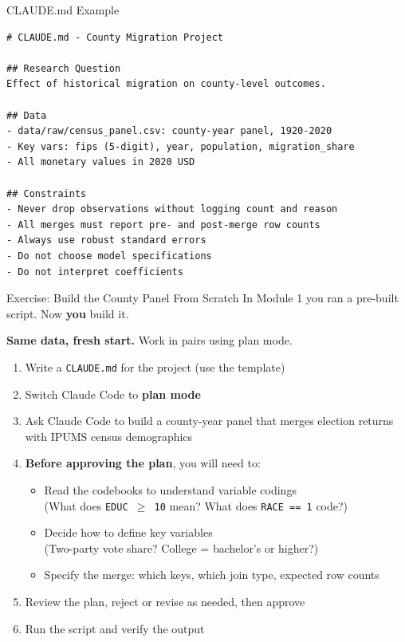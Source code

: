 \documentclass[aspectratio=169, 11pt]{beamer}
\begin{document}
\begin{frame}[fragile]{CLAUDE.md Example}
\begin{lstlisting}
# CLAUDE.md - County Migration Project

## Research Question
Effect of historical migration on county-level outcomes.

## Data
- data/raw/census_panel.csv: county-year panel, 1920-2020
- Key vars: fips (5-digit), year, population, migration_share
- All monetary values in 2020 USD

## Constraints
- Never drop observations without logging count and reason
- All merges must report pre- and post-merge row counts
- Always use robust standard errors
- Do not choose model specifications
- Do not interpret coefficients
\end{lstlisting}
\end{frame}


\begin{frame}{Exercise: Build the County Panel From Scratch}
  In Module 1 you ran a pre-built script. Now \textbf{you} build it.

  \vspace{0.3em}
  \textbf{Same data, fresh start.} Work in pairs using plan mode.

  \vspace{0.5em}
  \begin{enumerate}
    \item Write a \texttt{CLAUDE.md} for the project (use the template)
    \item Switch Claude Code to \textbf{plan mode}
    \item Ask Claude Code to build a county-year panel that merges election returns with IPUMS census demographics
    \item \textbf{Before approving the plan}, you will need to:
      \begin{itemize}
        \item Read the codebooks to understand variable codings\\
          {\small (What does \texttt{EDUC $\geq$ 10} mean? What does \texttt{RACE == 1} code?)}
        \item Decide how to define key variables\\
          {\small (Two-party vote share? College = bachelor's or higher?)}
        \item Specify the merge: which keys, which join type, expected row counts
      \end{itemize}
    \item Review the plan, reject or revise as needed, then approve
    \item Run the script and verify the output
  \end{enumerate}
\end{frame}
\end{document}
